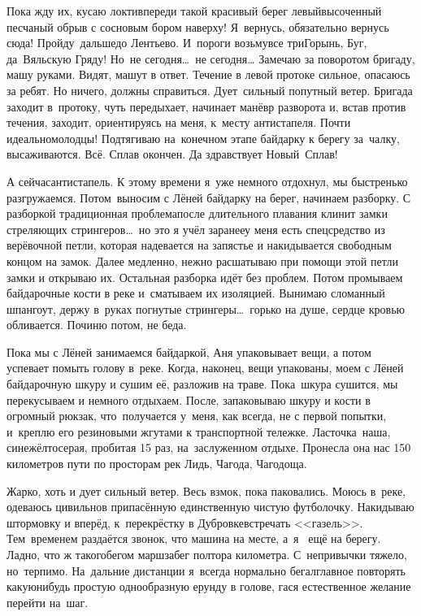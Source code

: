 Пока жду их, кусаю локти\mdash впереди такой красивый берег левый\mdash высоченный песчаный обрыв с сосновым бором наверху! Я~вернусь, обязательно вернусь сюда! Пройду~дальше\mdash до Лентьево. И~пороги возьму\mdash все три\mdash Горынь, Буг, да~Вяльскую Гряду! Но~не сегодня\ldots~не сегодня\ldots 
\newpage
Замечаю за поворотом бригаду, машу руками. Видят, машут в ответ. Течение в левой протоке сильное, опасаюсь за ребят. Но ничего, должны справиться. Дует~сильный попутный ветер. Бригада заходит в~протоку, чуть передыхает, начинает манёвр разворота и, встав против течения, заходит, ориентируясь на меня, к~месту антистапеля. Почти идеально\mdash  молодцы! Подтягиваю на~конечном этапе байдарку к берегу за~чалку, высаживаются. Всё. Сплав окончен. Да здравствует Новый~Сплав! 

А сейчас\mdash антистапель. К этому времени я~уже немного отдохнул, мы быстренько разгружаемся. Потом~выносим с Лёней байдарку на берег, начинаем разборку. С разборкой традиционная проблема\mdash после длительного плавания клинит замки стреляющих стрингеров\ldots~но это я учёл заранее\mdash у меня есть спецсредство из верёвочной петли, которая надевается на запястье и накидывается свободным концом на замок. Далее медленно, нежно расшатываю при помощи этой петли замки и открываю их. Остальная разборка идёт без проблем. Потом промываем байдарочные кости в реке и~сматываем их изоляцией. Вынимаю сломанный шпангоут, держу в~руках погнутые стрингеры\ldots~горько на душе, сердце кровью обливается. Починю потом, не беда. 

Пока мы с Лёней занимаемся байдаркой, Аня упаковывает вещи, а потом успевает помыть голову в~реке. Когда, наконец, вещи упакованы, моем с Лёней байдарочную шкуру и сушим её, разложив на траве. Пока~шкура сушится, мы перекусываем и немного отдыхаем. После, запаковываю шкуру и кости в огромный рюкзак, что~получается у~меня, как всегда, не с первой попытки, и~креплю его резиновыми жгутами к транспортной тележке. Ласточка~наша, сине\sdash жёлто\sdash серая, пробитая 15 раз, на~заслуженном отдыхе. Пронесла она нас 150 километров пути по просторам рек Лидь, Чагода, Чагодоща. 

Жарко, хоть и дует сильный ветер. Весь взмок, пока паковались. Моюсь в~реке, одеваюсь цивильно\mdash в припасённую единственную чистую футболочку. Накидываю штормовку и вперёд, к~перекрёстку в Дубровке\mdash встречать <<газель>>. Тем~временем раздаётся звонок, что машина на месте, а~я~ ещё на берегу. Ладно, что ж такого\mdash бегом марш\mdash забег полтора километра. С~непривычки тяжело, но~терпимо. На~дальние дистанции я~всегда нормально бегал\mdash главное повторять какую\sdash нибудь простую однообразную ерунду в голове, гася естественное желание перейти на~шаг. 

